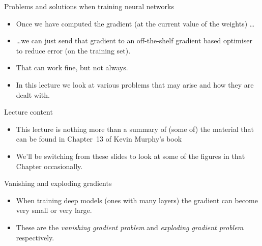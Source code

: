 \documentclass[10pt]{beamer}
\begin{document}
\begin{titledslide}{Problems and solutions when training neural networks}

  \begin{itemize}
  \item Once we have computed the gradient (at the current value of
    the weights) \dots
  \item \dots we can just send that gradient to an off-the-shelf
    gradient based optimiser to reduce error (on the training set).
  \item That can work fine, but not always.
  \item In this lecture we look at various problems that may arise and
    how they are dealt with.
  \end{itemize}
  
\end{titledslide}
\begin{titledslide}{Lecture content}

  \begin{itemize}
  \item This lecture is nothing more than a summary of (some of) the
    material that can be found in Chapter~13 of Kevin Murphy's book
    \cite{pml1Book}
  \item We'll be switching from these slides to look at some of the
    figures in that Chapter occasionally.
  \end{itemize}
  
\end{titledslide}
\begin{titledslide}{Vanishing and exploding gradients}

  \begin{itemize}
  \item When training deep models (ones with many layers) the gradient
    can become very small or very large.
  \item These are the \emph{vanishing gradient problem} and
    \emph{exploding gradient problem} respectively.
  \end{itemize}
  
\end{titledslide}
\end{document}
